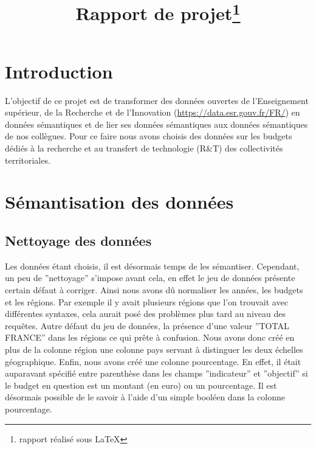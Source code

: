 \documentclass[a4paper,sffamily,12pt]{article}
\title{\vspace{\fill}\LARGE\bfseries\sffamily Rapport de projet\protect\footnote{rapport réalisé sous \LaTeX} \vspace{\fill}}
\begin{document}
	\date{} %
	\maketitle %

	\thispagestyle{fancy} %
	
	\newpage
			
	\renewcommand{\contentsname}{Sommaire}
	\tableofcontents
	
	\newpage
	
	\section{Introduction}

		\vspace{0.5cm}

		L’objectif de ce projet est de transformer des données ouvertes de l'Enseignement supérieur, de la Recherche et de l'Innovation (\url{https://data.esr.gouv.fr/FR/}) en données sémantiques et de lier ses données sémantiques aux données sémantiques de nos collègues. Pour ce faire nous avons choisis des données sur les budgets dédiés à la recherche et au transfert de technologie (R\&T) des collectivités territoriales. \\
		
		\vspace{0.5cm}
		
	\section{Sémantisation des données}				

		\vspace{0.5cm}
		
		\subsection{Nettoyage des données}
			
			\vspace{0.5cm}
			
			Les données étant choisis, il est désormais temps de les sémantiser. Cependant, un peu de ''nettoyage'' s'impose avant cela, en effet le jeu de données présente certain défaut à corriger. Ainsi nous avons dû normaliser les années, les budgets et les régions. Par exemple il y avait plusieurs régions que l'on trouvait avec différentes syntaxes, cela aurait posé des problèmes plus tard au niveau des requêtes. Autre défaut du jeu de données, la présence d'une valeur ''TOTAL FRANCE'' dans les régions ce qui prête à confusion. Nous avons donc créé en plus de la colonne région une colonne pays servant à distinguer les deux échelles géographique. Enfin, nous avons créé une colonne pourcentage. En effet, il était auparavant spécifié entre parenthèse dans les champs ''indicateur'' et ''objectif'' si le budget en question est un montant (en euro) ou un pourcentage. Il est désormais possible de le savoir à l'aide d'un simple booléen dans la colonne pourcentage.
		
\end{document}
